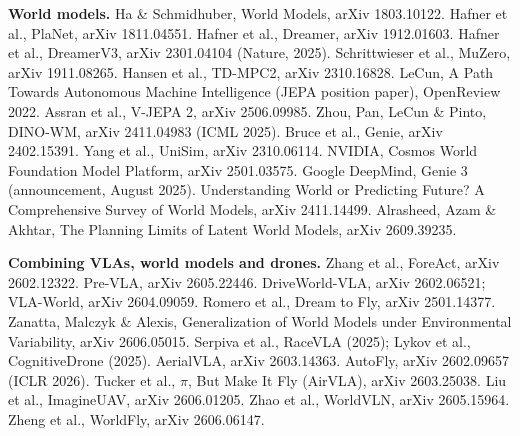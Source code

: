 \textbf{World models.}
Ha \& Schmidhuber, World Models, arXiv 1803.10122.
Hafner et al., PlaNet, arXiv 1811.04551.
Hafner et al., Dreamer, arXiv 1912.01603.
Hafner et al., DreamerV3, arXiv 2301.04104 (Nature, 2025).
Schrittwieser et al., MuZero, arXiv 1911.08265.
Hansen et al., TD-MPC2, arXiv 2310.16828.
LeCun, A Path Towards Autonomous Machine Intelligence (JEPA position paper), OpenReview 2022.
Assran et al., V-JEPA 2, arXiv 2506.09985.
Zhou, Pan, LeCun \& Pinto, DINO-WM, arXiv 2411.04983 (ICML 2025).
Bruce et al., Genie, arXiv 2402.15391.
Yang et al., UniSim, arXiv 2310.06114.
NVIDIA, Cosmos World Foundation Model Platform, arXiv 2501.03575.
Google DeepMind, Genie 3 (announcement, August 2025).
Understanding World or Predicting Future? A Comprehensive Survey of World Models, arXiv 2411.14499.
Alrasheed, Azam \& Akhtar, The Planning Limits of Latent World Models, arXiv 2609.39235.

\textbf{Combining VLAs, world models and drones.}
Zhang et al., ForeAct, arXiv 2602.12322.
Pre-VLA, arXiv 2605.22446.
DriveWorld-VLA, arXiv 2602.06521; VLA-World, arXiv 2604.09059.
Romero et al., Dream to Fly, arXiv 2501.14377.
Zanatta, Malczyk \& Alexis, Generalization of World Models under Environmental Variability, arXiv 2606.05015.
Serpiva et al., RaceVLA (2025); Lykov et al., CognitiveDrone (2025).
AerialVLA, arXiv 2603.14363.
AutoFly, arXiv 2602.09657 (ICLR 2026).
Tucker et al., $\pi$, But Make It Fly (AirVLA), arXiv 2603.25038.
Liu et al., ImagineUAV, arXiv 2606.01205.
Zhao et al., WorldVLN, arXiv 2605.15964.
Zheng et al., WorldFly, arXiv 2606.06147.
